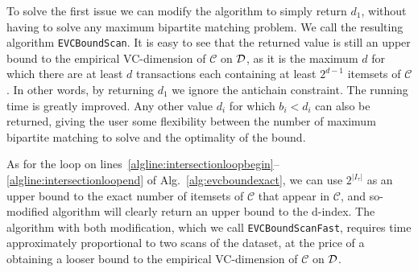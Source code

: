 To solve the first issue we can modify the algorithm to simply return $d_1$,
without having to solve any maximum bipartite matching problem. We call the
resulting algorithm \texttt{EVCBoundScan}. It is easy to see that the returned
value is still an upper bound to the empirical VC-dimension of $\mathcal{C}$ on
${\cal D}$, as it is the maximum $d$ for which there are at least $d$ transactions
each containing at least $2^{d-1}$ itemsets of $\mathcal{C}$. In other words, by
returning $d_1$ we ignore the antichain constraint. The running time is greatly
improved. Any other value $d_i$ for which $b_i < d_i$ can also be returned,
giving the user some flexibility between the number of maximum bipartite
matching to solve and the optimality of the bound.
%
%


As for the loop on
lines~\ref{algline:intersectionloopbegin}--\ref{algline:intersectionloopend} of
Alg.~\ref{alg:evcboundexact}, we can use $2^{|I_\tau|}$ as an upper bound to the
exact number of itemsets of $\mathcal{C}$ that appear in $\mathcal{C}$, and
so-modified algorithm will clearly return an upper bound to the d-index. The
algorithm with both modification, which we call \texttt{EVCBoundScanFast},
requires time approximately proportional to two scans of the dataset, at the
price of a obtaining a looser bound to the empirical VC-dimension of
$\mathcal{C}$ on ${\cal D}$.

